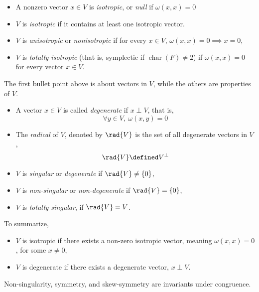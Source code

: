 \documentclass[../main-v2-manifolds.tex]{subfiles}
\begin{document}
    \begin{definition}
        \begin{itemize}
            \item A nonzero vector $x\in V$ is \emph{isotropic}, or \emph{null} if $\omega(x,x)=0$
            \item $V$ is \emph{isotropic} if it contains at least one isotropic vector.
            \item $V$ is \emph{anisotropic} or \emph{nonisotropic} if for every $x\in V$, $\omega(x,x)=0\implies x=0$,
            \item $V$ is \emph{totally isotropic} (that is, symplectic if $\operatorname{char}(F)\neq 2$) if $\omega(x,x)=0$ for every vector $x\in V$. 
        \end{itemize}
        
            The first bullet point above is about vectors in $V$, while the others are properties of $V$.
        \begin{itemize}
            \item A vector $x\in V$ is called \emph{degenerate} if $x\perp V$, that is, 
            \[
                \forall y\in V,\: \omega(x,y)=0
            \]
            \item The \emph{radical} of $V$, denoted by $\rad{V}$ is the set of all degenerate vectors in $V$,
            \[
                \rad{V}\defined V^\perp  
            \]
            \item $V$ is \emph{singular} or \emph{degenerate} if $\rad{V}\neq \{0\}$,
            \item $V$ is \emph{non-singular} or \emph{non-degenerate} if $\rad{V} = \{0\}$,
            \item $V$ is \emph{totally singular}, if $\rad{V} = V$. 
        \end{itemize}
        To summarize,
        \begin{itemize}
            \item $V$ is isotropic if there exists a non-zero isotropic vector, meaning $\omega(x,x)=0$, for some $x\neq 0$,
            \item $V$ is degenerate if there exists a degenerate vector, $x\perp V$.
        \end{itemize}
    \end{definition}
    \begin{wts}\label{matrix-invariants-under-congruence}
        Non-singularity, symmetry, and skew-symmetry are invariants under congruence.
    \end{wts}
\end{document}

